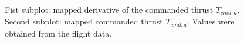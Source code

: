 \documentclass[11pt, a4paper, twoside]{report}
\begin{document}
\begin{figure}[h]
	\centering 
	\captionsetup{justification=centering, singlelinecheck=off, font=bf, belowskip=-0.5cm}
	\caption[Estimation of the thrust mapping parameter]{Fist subplot: mapped derivative of the commanded thrust $\dot{T}_{cmd, a}$. Second subplot: mapped commanded thrust $\dot{T}_{cmd, a}$. Values were obtained from the flight data.}
	\label{fig:thrust_mapping}
\end{figure}


\end{document}
